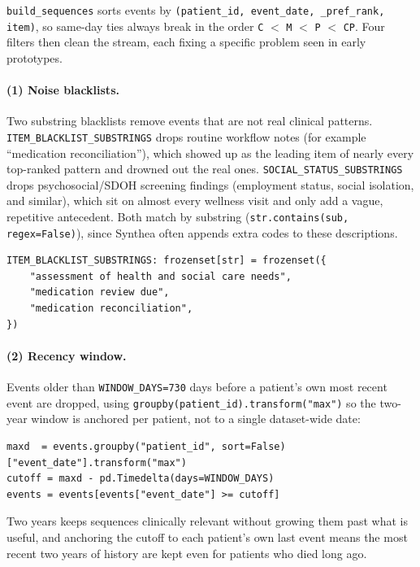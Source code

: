 \texttt{build\_sequences} sorts events by \texttt{(patient\_id, event\_date, \_pref\_rank, item)}, so same-day ties always break in the order \texttt{C} \(<\) \texttt{M} \(<\) \texttt{P} \(<\) \texttt{CP}. Four filters then clean the stream, each fixing a specific problem seen in early prototypes.

\paragraph{(1) Noise blacklists.} Two substring blacklists remove events that are not real clinical patterns. \texttt{ITEM\_BLACKLIST\_SUBSTRINGS} drops routine workflow notes (for example ``medication reconciliation''), which showed up as the leading item of nearly every top-ranked pattern and drowned out the real ones. \texttt{SOCIAL\_STATUS\_SUBSTRINGS} drops psychosocial/SDOH screening findings (employment status, social isolation, and similar), which sit on almost every wellness visit and only add a vague, repetitive antecedent. Both match by substring (\texttt{str.contains(sub, regex=False)}), since Synthea often appends extra codes to these descriptions.

\vspace{0.25cm}

\begin{lstlisting}[style=pythonstyle]
ITEM_BLACKLIST_SUBSTRINGS: frozenset[str] = frozenset({
    "assessment of health and social care needs",
    "medication review due",
    "medication reconciliation",
})
\end{lstlisting}

\paragraph{(2) Recency window.} Events older than \texttt{WINDOW\_DAYS=730} days before a patient's own most recent event are dropped, using \texttt{groupby(patient\_id).transform("max")} so the two-year window is anchored per patient, not to a single dataset-wide date:

\vspace{0.25cm}

\begin{lstlisting}[style=pythonstyle]
maxd  = events.groupby("patient_id", sort=False)["event_date"].transform("max")
cutoff = maxd - pd.Timedelta(days=WINDOW_DAYS)
events = events[events["event_date"] >= cutoff]
\end{lstlisting}

\noindent Two years keeps sequences clinically relevant without growing them past what is useful, and anchoring the cutoff to each patient's own last event means the most recent two years of history are kept even for patients who died long ago.

